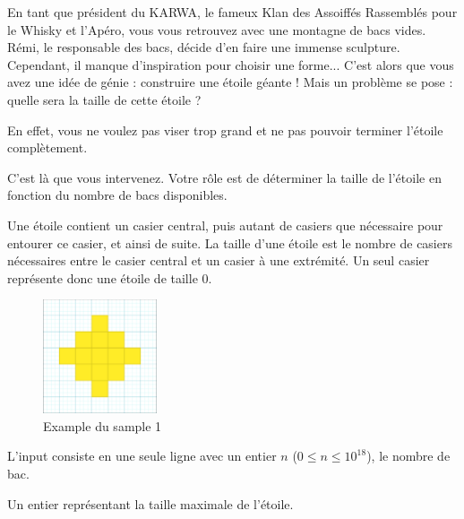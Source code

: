\problemname{}


\newcommand{\maxn}{10^{18}}

En tant que président du KARWA, le fameux Klan des Assoiffés Rassemblés pour le Whisky et l'Apéro, vous vous retrouvez avec une montagne de bacs vides. Rémi, le responsable des bacs, décide d'en faire une immense sculpture. Cependant, il manque d'inspiration pour choisir une forme... 
C'est alors que vous avez une idée de génie : construire une étoile géante ! Mais un problème se pose : quelle sera la taille de cette étoile ?

En effet, vous ne voulez pas viser trop grand et ne pas pouvoir terminer l'étoile complètement.

C'est là que vous intervenez. Votre rôle est de déterminer la taille de l'étoile en fonction du nombre de bacs disponibles.

Une étoile contient un casier central, puis autant de casiers que nécessaire pour entourer ce casier, et ainsi de suite. La taille d'une étoile est le nombre de casiers nécessaires entre le casier central et un casier à une extrémité. Un seul casier représente donc une étoile de taille $0$.

\smallskip
\begin{figure}[h]
    \centering
    \includegraphics[width=0.3\textwidth]{example.png}
    \caption{Example du sample 1}
\end{figure}


\begin{Input}
    L'input consiste en une seule ligne avec un entier $n$ ($0\leq n\leq \maxn$), le nombre de bac.
\end{Input}

\begin{Output}
    Un entier représentant la taille maximale de l'étoile.
\end{Output}

